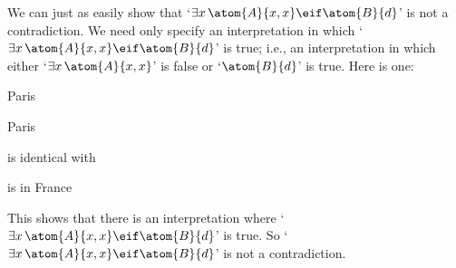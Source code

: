 We can just as easily show that `$\exists x\,\atom{A}{x,x} \eif \atom{B}{d}$' is not a contradiction. We need only specify an interpretation in which `$\exists x\,\atom{A}{x,x} \eif \atom{B}{d}$' is true; i.e., an interpretation in which either `$\exists x\, \atom{A}{x,x}$' is false or `$\atom{B}{d}$' is true. Here is one:
	\begin{ekey}
		\item[\text{domain}] Paris
		\item[d] Paris
		\item[\atom{A}{x,y}]  is identical with 
		\item[\atom{B}{x}]  is in France
	\end{ekey}
This shows that there is an interpretation where `$\exists x\,\atom{A}{x,x} \eif \atom{B}{d}$' is true. So `$\exists x\, \atom{A}{x,x} \eif \atom{B}{d}$' is not a contradiction.

